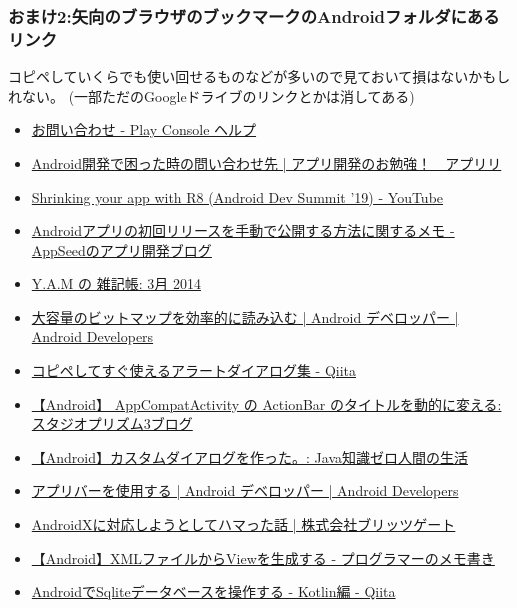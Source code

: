 \documentclass[dvipdfmx,jb5]{jarticle}
\newcommand{\link}[2]{\href{#2}{#1}}
\begin{document}
\subsubsection{おまけ2:矢向のブラウザのブックマークのAndroidフォルダにあるリンク}
コピペしていくらでも使い回せるものなどが多いので見ておいて損はないかもしれない。
(一部ただのGoogleドライブのリンクとかは消してある)
\begin{itemize}
\item \link{お問い合わせ - Play Console ヘルプ}{https://support.google.com/googleplay/android-developer/gethelp?hl=ja\&visit\_id=637678981545128687-2809304254\&rd=1\#}
\item \link{Android開発で困った時の問い合わせ先 | アプリ開発のお勉強！　アプリリ}{https://bit.ly/3on3bmL}
\item \link{Shrinking your app with R8 (Android Dev Summit '19) - YouTube}{https://www.youtube.com/watch?v=uQ_yK8kRCaA}
\item \link{Androidアプリの初回リリースを手動で公開する方法に関するメモ - AppSeedのアプリ開発ブログ}{https://develop.hateblo.jp/entry/google-play-manual-release}
\item \link{Y.A.M の 雑記帳: 3月 2014}{http://y-anz-m.blogspot.com/2014/03/}
\item \link{大容量のビットマップを効率的に読み込む  |  Android デベロッパー  |  Android Developers}{https://developer.android.com/topic/performance/graphics/load-bitmap?hl=ja}
\item \link{コピペしてすぐ使えるアラートダイアログ集 - Qiita}{https://qiita.com/suzukihr/items/8973527ebb8bb35f6bb8}
\item \link{【Android】 AppCompatActivity の ActionBar のタイトルを動的に変える: スタジオプリズム\UTF{3427}3ブログ}{http://s-prism3.seesaa.net/article/438905821.html}
\item \link{【Android】カスタムダイアログを作った。: Java知識ゼロ人間の生活}{http://stren-blog.seesaa.net/article/367038846.html}
\item \link{アプリバーを使用する  |  Android デベロッパー  |  Android Developers}{https://developer.android.com/guide/fragments/appbar?hl=ja}
\item \link{AndroidXに対応しようとしてハマった話 | 株式会社ブリッツゲート}{https://blitzgate.co.jp/blog/2350/}
\item \link{【Android】XMLファイルからViewを生成する - プログラマーのメモ書き}{https://bit.ly/3wDqZq9}
\item \link{AndroidでSqliteデータベースを操作する - Kotlin編 - Qiita}{https://qiita.com/NaoSekig/items/0d95d631378040c1961a}

\end{itemize}
\end{document}
